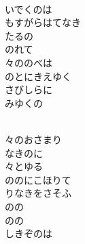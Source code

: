 \documentclass[10pt,b5j]{tarticle} %
\begin{document}
\begin{enumerate}
\begin{minipage}[c]{\blocksize}
    \end{minipage}
    \begin{minipage}[c]{\blocksize}
        
        \vspace{\linespace}
        \item~\\
        いでくのは\\
        もすがらはてなき\\
        たるの\\
        のれて\\
        々ののべは\\
        のとにきえゆく\\
        さびしらに\\
        みゆくの
        
    \end{minipage}
    \begin{minipage}[c]{\blocksize}
        
        \vspace{\linespace}
        \item~\\
        々のおさまり\\
        なきのに\\
        々とゆる\\
        ののにこほりて\\
        りなきをさそふ\\
        のの\\
        のの\\
        しきぞのは
        
    \end{minipage}
    \begin{minipage}[c]{\blocksize}
        

\end{minipage}
\end{enumerate}
\end{document}
